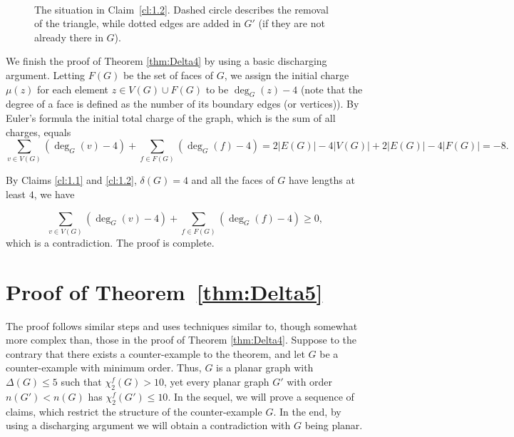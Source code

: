 \documentclass[11pt]{article}
\newcommand{\fd}{\chi_{2}^{f}}
\begin{document}
\begin{figure}[ht!]
\begin{center}
 \\
	\caption{The situation in Claim~\ref{cl:1.2}. Dashed circle describes the removal of the triangle, while dotted edges are added in $G'$ (if they are not already there in $G$). }\label{fig:cl:1.2}
\end{center}
\end{figure}

We finish the proof of Theorem \ref{thm:Delta4} by using a basic discharging argument.
Letting $F(G)$ be the set of faces of $G$, we assign the initial charge $\mu(z)$ for each element $z\in V(G)\cup F(G)$ to be $\deg_G(z)-4$ (note that the degree of a face is defined as the number of its boundary edges (or vertices)). By Euler's formula the initial total charge of the graph, which is the sum of all charges, equals
$$\sum_{v\in V(G)}{(\deg_G(v)-4)}+\sum_{f\in F(G)}{(\deg_G(f)-4)}=2|E(G)|-4|V(G)|+2|E(G)|-4|F(G)|=-8.$$

By Claims \ref{cl:1.1} and \ref{cl:1.2}, $\delta(G)=4$ and all the faces of $G$ have lengths at least $4$, we have

$$\sum_{v\in V(G)}{(\deg_G(v)-4)}+\sum_{f\in F(G)}{(\deg_G(f)-4)}\ge 0,$$ which is a contradiction. The proof is complete.



\section{Proof of Theorem~\ref{thm:Delta5}}
\label{sec:Delta5}

The proof follows similar steps and uses techniques similar to, though somewhat more complex than, those in the proof of Theorem \ref{thm:Delta4}. Suppose to the contrary that there exists a counter-example to the theorem, and let $G$ be a counter-example with minimum order. Thus, $G$ is a planar graph with $\Delta(G)\le 5$ such that $\fd(G)>10$, yet every planar graph $G'$ with order $n(G')<n(G)$ has $\fd(G')\le 10$. In the sequel, we will prove a sequence of claims, which restrict the structure of the counter-example $G$. In the end, by using a discharging argument we will obtain a contradiction with $G$ being planar. 
\end{document}
